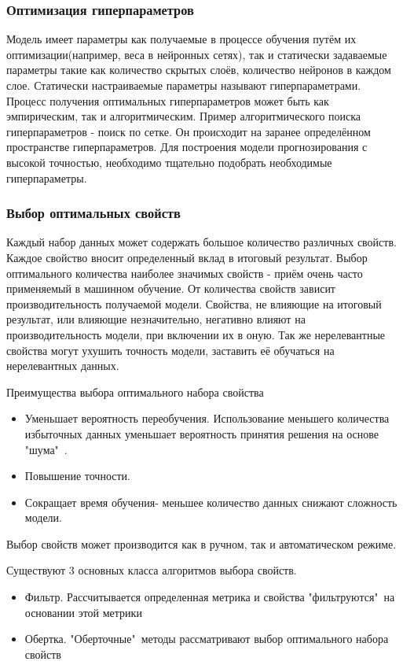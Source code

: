 \subsubsection{Оптимизация гиперпараметров}
Модель имеет параметры как получаемые в процессе обучения путём их оптимизации(например, веса в нейронных сетях), 
так и статически задаваемые параметры такие как количество скрытых слоёв, количество нейронов в каждом слое. Статически настраиваемые параметры называют гиперпараметрами. Процесс получения оптимальных гиперпараметров может быть как эмпирическим, так и алгоритмическим. Пример алгоритмического поиска гиперпараметров - поиск по сетке. Он происходит на заранее определённом пространстве гиперпараметров. Для построения модели прогнозирования с высокой точностью, необходимо тщательно подобрать необходимые гиперпараметры.

\subsubsection{Выбор оптимальных свойств}
Каждый набор данных может содержать большое количество различных свойств. Каждое свойство вносит определенный вклад в итоговый результат. Выбор оптимального количества наиболее значимых свойств - приём очень часто применяемый в машинном обучение. От количества свойств зависит производительность получаемой модели. Свойства, не влияющие на итоговый результат, или влияющие незначительно, негативно влияют на производительность модели, при включении их в оную. Так же нерелевантные свойства могут ухушить точность модели, заставить её обучаться на нерелевантных данных\cite{Book14}.

Преимущества выбора оптимального набора свойства
\begin{itemize}
	\item Уменьшает вероятность переобучения. Использование меньшего количества избыточных данных уменьшает вероятность принятия решения на основе "шума"\ .
	\item Повышение точности.
	\item Сокращает время обучения- меньшее количество данных снижают сложность модели.
\end{itemize}
Выбор свойств может производится как в ручном, так и автоматическом режиме.

Существуют 3 основных класса алгоритмов выбора свойств.
\begin{itemize}
\item Фильтр. Рассчитывается определенная метрика и свойства "фильтруются"\ на основании этой метрики
\item Обертка. "Оберточные"\ методы рассматривают выбор оптимального набора свойств
\end{itemize}

